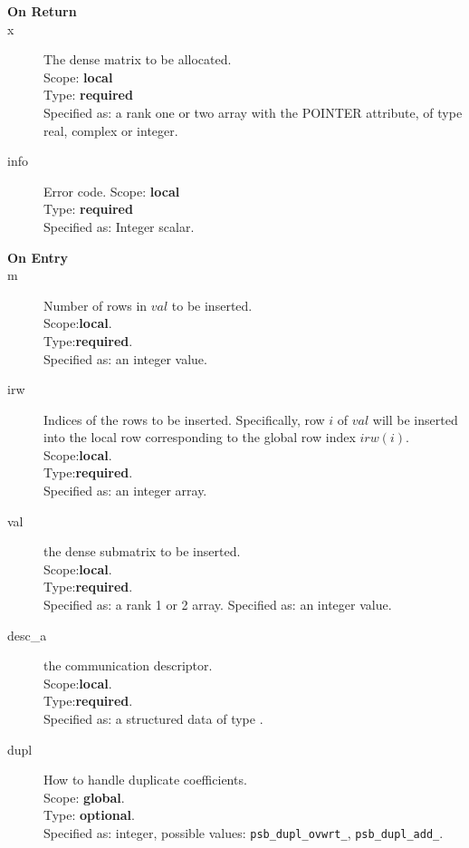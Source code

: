 \begin{description}
\item[\bf On Return]
\item[x] The dense matrix to be allocated.\\
Scope: {\bf local} \\
Type: {\bf required}\\
Specified as: a rank one or two array with the POINTER
attribute, of type real, complex or integer.\\
\item[info] Error code.
Scope: {\bf local} \\
Type: {\bf required}\\
Specified as: Integer scalar.
\end{description}


%
%


\begin{description}
\item[\bf On Entry]
\item[m] Number of rows in $val$  to be inserted.\\
Scope:{\bf local}.\\
Type:{\bf required}.\\
Specified as: an integer value.
\item[irw] Indices of the rows to be inserted. Specifically, row $i$
  of $val$ will be inserted into the local row corresponding to the
  global row index $irw(i)$.
Scope:{\bf local}.\\
Type:{\bf required}.\\
Specified as: an integer array.
\item[val] the dense submatrix to be inserted.\\
Scope:{\bf local}.\\
Type:{\bf required}.\\
Specified as: a rank 1 or 2  array.
Specified as: an integer value.
\item[desc\_a] the communication descriptor.\\
Scope:{\bf local}.\\
Type:{\bf required}.\\
Specified as: a structured data of type \descdata.
\item[dupl] How to handle duplicate coefficients.\\
Scope: {\bf global}.\\
Type: {\bf optional}.\\
Specified as: integer, possible values: \verb|psb_dupl_ovwrt_|,
\verb|psb_dupl_add_|.
\end{description}

